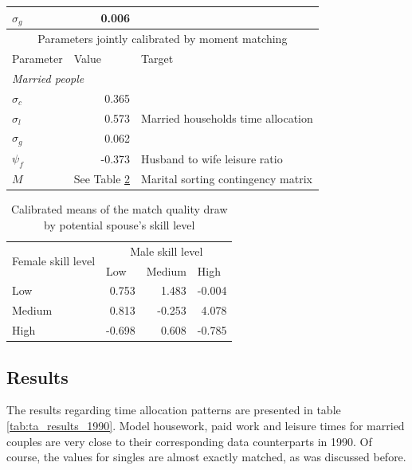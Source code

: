 \documentclass[12pt]{article}
\begin{document}
\begin{table}[htbp]
\begin{tabular}{lll}
		$\sigma_g$ & \multicolumn{1}{r}{0.006} &  \\
		\midrule
		\multicolumn{3}{c}{Parameters jointly calibrated by moment matching} \\
		\midrule
		Parameter & Value & Target \\
		\midrule
		\multicolumn{2}{l}{\textit{Married people}} &  \\
		$\sigma_c$ & \multicolumn{1}{r}{0.365} &  \\
		$\sigma_l$ & \multicolumn{1}{r}{0.573} & \multicolumn{1}{p{20.68em}}{Married households time allocation} \\
		$\sigma_g$ & \multicolumn{1}{r}{0.062} &  \\
		$\psi_f$ & \multicolumn{1}{r}{-0.373} & Husband to wife leisure ratio \\
		$M$ & See Table \ref{tab:Mu}& Marital sorting contingency matrix \\
		\bottomrule
		\bottomrule
	\end{tabular}
	\label{tab:calibrated_parameters}
\end{table}

\begin{table}[]
	\centering
	\caption{Calibrated means of the match quality draw by potential spouse's skill level}
	\begin{tabular}{lrrr}
		\toprule
		\multicolumn{1}{c}{\multirow{2}[4]{*}{Female skill level}} & \multicolumn{3}{c}{Male skill level} \\
		\cmidrule{2-4}          & \multicolumn{1}{l}{Low} & \multicolumn{1}{l}{Medium} & \multicolumn{1}{l}{High} \\
		\midrule
		Low   & 0.753 & 1.483 & -0.004 \\
		Medium & 0.813 & -0.253 & 4.078 \\
		High  & -0.698 & 0.608 & -0.785 \\
		\bottomrule
		\bottomrule
	\end{tabular}
	\label{tab:Mu}
\end{table}

\subsection{Results}

The results regarding time allocation patterns are presented in table \ref{tab:ta_results_1990}. Model housework, paid work and leisure times for married couples are very close to their corresponding data counterparts in 1990. Of course, the values for singles are almost exactly matched, as was discussed before. 
\end{document}
